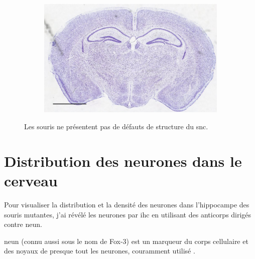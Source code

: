 \begin{figure}[h]
\begin{center}
\begin{subfigure}[h]{0.49\textwidth}
			\end{subfigure}
			\begin{subfigure}[h]{0.49\textwidth}%
				\caption{}
				\label{fig:MaleMutNissl}
				\includegraphics[width=\textwidth]{./Images/Nissl/MaleMut.jpg}
			\end{subfigure}
		\end{center}
		\caption{Les souris \mcrd ne présentent pas de défauts de structure du \acrshort{snc}.}
		\label{fig:NisslResultat}
	\end{figure}

\section{Distribution des neurones dans le cerveau}
	\label{sec:neun}
	Pour visualiser la distribution et la densité des neurones dans l'hippocampe des souris mutantes, j'ai révélé les neurones par \acrshort{ihc} en utilisant des anticorps dirigés contre \acrshort{neun}.
	
	\Acrshort{neun} (connu aussi sous le nom de Fox-3) est un marqueur du  corps cellulaire et des noyaux de presque tout les neurones, couramment utilisé \cite{Guselnikova2015, Kim2009}.
	
